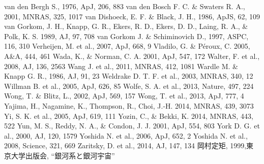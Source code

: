 \begin{thebibliography}{99}
\begin{multicols}{2}
{
	van den Bergh S., 1976, ApJ, 206, 883
	van den Bosch F. C. \& Swaters R. A., 2001, MNRAS, 325, 1017
      van Dishoeck, E. F. \& Black, J. H., 1986, ApJS, 62, 109
    	van Gorkom, J. H., Knapp, G. R., Ekers, R. D., Ekers, D. D.,
    	Laing, R. A., \& Polk, K. S. 1989, AJ, 97, 708
	van Gorkom J. \& Schiminovich D., 1997, ASPC, 116, 310
	Verheijen, M. et al., 2007, ApJ, 668, 9
    	Vladilo, G. \& P\'{e}roux, C. 2005, A\&A, 444, 461
   	Wada, K., \& Norman, C. A. 2001, ApJ, 547, 172
	Walter, F. et al., 2008, AJ, 136, 2563
	Wang J. et al., 2011, MNRAS, 412, 1081
	Wardle M. \& Knapp G. R., 1986, AJ, 91, 23
	Weldrake D. T. F. et al., 2003, MNRAS, 340, 12
	Willman B. et al., 2005, ApJ, 626, 85
	Wolfe, S. A. et al., 2013, Nature, 497, 224
	Wong, T. \& Blitz, L., 2002, ApJ, 569, 157
	Wong, T. et al., 2013, ApJ, 777, 4
   	Yajima, H., Nagamine, K., Thompson, R., Choi, J.-H. 2014, MNRAS,
   	439, 3073
	Yi, S. K. et al., 2005, ApJ, 619, 111
   	Yozin, C., \& Bekki, K. 2014, MNRAS, 443, 522
    	Yun, M. S., Reddy, N. A., \& Condon, J. J. 2001, ApJ, 554, 803
	York D. G. et al., 2000, AJ, 120, 1579
    	Yoshida N. et al., 2006, ApJ, 652, 2
   	Yoshida N. et al., 2008, Science, 321, 669
	Zaritsky, D. et al., 2014, AJ, 147, 134
	岡村定矩, 1999,東京大学出版会, ``銀河系と銀河宇宙''
}
\end{multicols}
\end{thebibliography}
